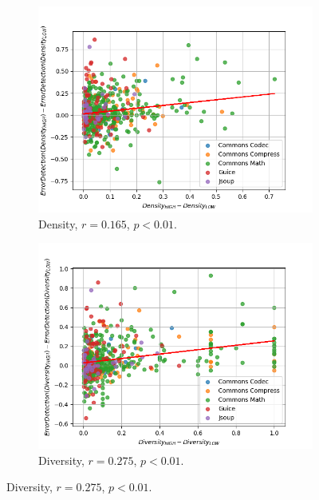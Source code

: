 \documentclass[twoside,a4paper,11pt]{memoir}
\begin{document}
\begin{figure}
    \centering
    \begin{subfigure}[b]{0.49\linewidth}
        \centering
        \includegraphics[width=\linewidth]{figures/delta_error_detection_density}
        \caption{Density, $r=0.165$, $p<0.01$.}
        \label{fig:delta_error_detection_density}
    \end{subfigure}
    \hfill
    \begin{subfigure}[b]{0.49\linewidth}
        \centering
        \includegraphics[width=\linewidth]{figures/delta_error_detection_diversity}
        \caption{Diversity, $r=0.275$, $p < 0.01$.}
        \label{fig:delta_error_detection_diversity}
    \end{subfigure}

\end{figure}
\end{document}
